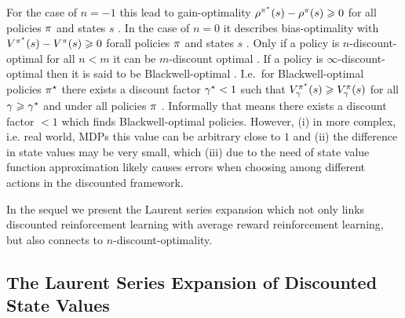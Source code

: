 \documentclass[envcountsame]{llncs}
\begin{document}
For the case of \(n=-1\) this lead to gain-optimality
\(\rho^{\pi^{\star}}(s) - \rho^{\pi}(s) \geqslant 0\) for all policies \(\pi\) and states \(s\)
\citep{Mahadevan96_AnAveragerewardReinforcementLearningAlgorithmForComputingBiasoptimalPolicies}. In
the case of \(n=0\) it describes bias-optimality with \(V^{\pi^{\star}}(s) - V^{\pi}(s) \geqslant 0\)
forall policies \(\pi\) and states \(s\)
\citep{Mahadevan96_AnAveragerewardReinforcementLearningAlgorithmForComputingBiasoptimalPolicies}.
%
Only if a policy is \(n\)-discount-optimal for all \(n < m\) it can be \(m\)-discount
optimal \citep{Puterman94,Veinott69}.
%
If a policy is \(\infty\)-discount-optimal then it is said to be
Blackwell-optimal \citep{Blackwell62}.
I.e.~for Blackwell-optimal policies \(\pi^{\star}\) there exists a discount factor \(\gamma^{\star} < 1\)
such that \(V_{\gamma}^{\pi^{\star}}(s) \geqslant V_{\gamma}^{\pi}(s)\) for all
\(\gamma \geqslant \gamma^{\star}\) and under all policies \(\pi\)
\citep{Mahadevan96_SensitiveDiscountOptimalityUnifyingDiscountedAndAverageRewardReinforcementLearning,Blackwell62}.
Informally that means there exists a discount factor \(<1\) which finds Blackwell-optimal policies.
However, (i) in more complex, i.e. real world, MDPs this value can be arbitrary close to \(1\) and
(ii) the difference in state values may be very small, which (iii) due to the need of state value
function approximation likely causes errors when choosing among different actions in the discounted
framework.
%
%


In the sequel we present the Laurent series expansion which not only links discounted reinforcement
learning with average reward reinforcement learning, but also connects to \(n\)-discount-optimality.



\subsection{The Laurent Series Expansion of Discounted State Values}
\label{subsec:The_Laurent_Series_Expansion_of_Discounted_State_Values}
\end{document}
